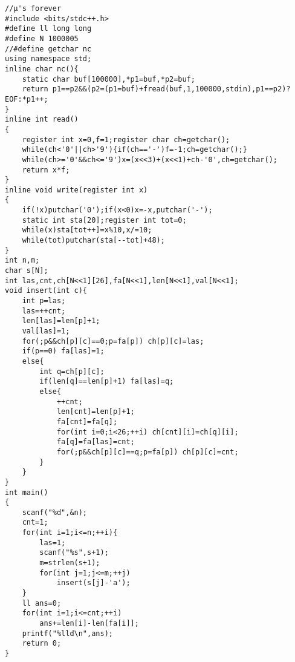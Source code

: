 \begin{verbatim}
//μ's forever
#include <bits/stdc++.h>
#define ll long long
#define N 1000005
//#define getchar nc
using namespace std;
inline char nc(){
    static char buf[100000],*p1=buf,*p2=buf;
    return p1==p2&&(p2=(p1=buf)+fread(buf,1,100000,stdin),p1==p2)?EOF:*p1++;
}
inline int read()
{
    register int x=0,f=1;register char ch=getchar();
    while(ch<'0'||ch>'9'){if(ch=='-')f=-1;ch=getchar();}
    while(ch>='0'&&ch<='9')x=(x<<3)+(x<<1)+ch-'0',ch=getchar();
    return x*f;
}
inline void write(register int x)
{
    if(!x)putchar('0');if(x<0)x=-x,putchar('-');
    static int sta[20];register int tot=0;
    while(x)sta[tot++]=x%10,x/=10;
    while(tot)putchar(sta[--tot]+48);
}
int n,m;
char s[N];
int las,cnt,ch[N<<1][26],fa[N<<1],len[N<<1],val[N<<1];
void insert(int c){
    int p=las;
    las=++cnt;
    len[las]=len[p]+1;
    val[las]=1;
    for(;p&&ch[p][c]==0;p=fa[p]) ch[p][c]=las;
    if(p==0) fa[las]=1;
    else{
        int q=ch[p][c];
        if(len[q]==len[p]+1) fa[las]=q;
        else{
            ++cnt;
            len[cnt]=len[p]+1;
            fa[cnt]=fa[q];
            for(int i=0;i<26;++i) ch[cnt][i]=ch[q][i];
            fa[q]=fa[las]=cnt;
            for(;p&&ch[p][c]==q;p=fa[p]) ch[p][c]=cnt;
        }
    }
}
int main()
{
    scanf("%d",&n);
    cnt=1;
    for(int i=1;i<=n;++i){
        las=1;
        scanf("%s",s+1);
        m=strlen(s+1);
        for(int j=1;j<=m;++j)
            insert(s[j]-'a');
    }
    ll ans=0;
    for(int i=1;i<=cnt;++i)
        ans+=len[i]-len[fa[i]];
    printf("%lld\n",ans);
    return 0;
}
\end{verbatim}
